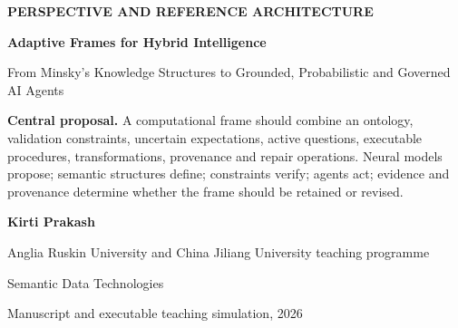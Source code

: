 \documentclass[11pt,a4paper]{article}
\begin{document}
\hypersetup{pageanchor=false}

\begin{titlepage}
  \pagecolor{ARUCream}
  \vspace*{1.4cm}
  {\color{ARURed}\bfseries\large PERSPECTIVE AND REFERENCE ARCHITECTURE}\par
  \vspace{0.55cm}
  {\color{ARUNavy}\fontsize{28}{33}\selectfont\bfseries
  Adaptive Frames for Hybrid Intelligence\par}
  \vspace{0.35cm}
  {\color{Ink}\Large From Minsky's Knowledge Structures to
  Grounded, Probabilistic and Governed AI Agents\par}
  \vspace{1.1cm}

  \begin{tcolorbox}[colback=white,colframe=ARUBlueGrey,arc=2mm,boxrule=0.8pt]
  \textbf{Central proposal.} A computational frame should combine an ontology,
  validation constraints, uncertain expectations, active questions, executable
  procedures, transformations, provenance and repair operations. Neural models
  propose; semantic structures define; constraints verify; agents act; evidence
  and provenance determine whether the frame should be retained or revised.
  \end{tcolorbox}

  \vfill
  {\large\bfseries Kirti Prakash}\par
  \vspace{0.15cm}
  {\normalsize Anglia Ruskin University and China Jiliang University teaching programme}\par
  \vspace{0.15cm}
  {\normalsize Semantic Data Technologies}\par
  \vspace{0.55cm}
  {\small Manuscript and executable teaching simulation, 2026}\par
  \vspace{1.2cm}
\end{titlepage}
\nopagecolor
\hypersetup{pageanchor=true}
\end{document}
